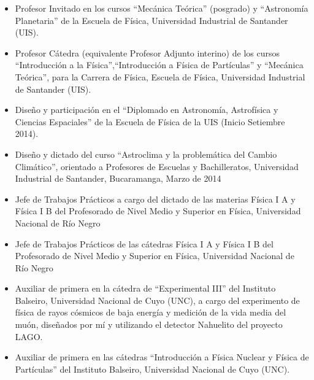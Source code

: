 \begin{itemize}
	\item {} Profesor Invitado en los cursos ``Mecánica Teórica'' (posgrado) y ``Astronomía Planetaria'' de la Escuela de Física, Universidad Industrial de Santander (UIS).
	\item {} Profesor Cátedra (equivalente Profesor Adjunto interino) de los cursos ``Introducción a la Física'',``Introducción a Física de Partículas'' y ``Mecánica Teórica'', para la Carrera de Física, Escuela de Física, Universidad Industrial de Santander (UIS).
    \item {} Diseño y participación en el ``Diplomado en Astronomía, Astrofísica y Ciencias Espaciales'' de la Escuela de Física de la UIS (Inicio Setiembre 2014).
	\item {} Diseño y dictado del curso ``Astroclima y la problemática del Cambio Climático'', orientado a Profesores de Escuelas y Bachilleratos, Universidad Industrial de Santander, Bucaramanga, Marzo de 2014
	\item {} Jefe de Trabajos Prácticos a cargo del dictado de las materias Física I A y Física I B del Profesorado de Nivel Medio y Superior en Física, Universidad Nacional de Río Negro
	\item {} Jefe de Trabajos Prácticos de las cátedras Física I A y Física I B del Profesorado de Nivel Medio y Superior en Física, Universidad Nacional de Río Negro
	\item {} Auxiliar de primera en la cátedra de ``Experimental III'' del Instituto Balseiro, Universidad Nacional de Cuyo (UNC), a cargo del experimento de física de rayos cósmicos de baja energía y medición de la vida media del muón, diseñados por mí y utilizando el detector Nahuelito del proyecto LAGO\@.
	\item {} Auxiliar de primera en las cátedras ``Introducción a Física Nuclear y Física de Partículas'' del Instituto Balseiro, Universidad Nacional de Cuyo (UNC).
\fi
\end{itemize}
\fi